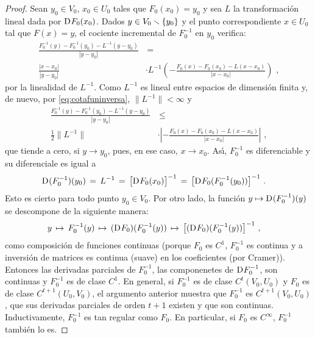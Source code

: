 \begin{proof}
	Sean $y_{0}\in V_{0}$, $x_{0}\in U_{0}$ tales que $F_{0}(x_{0})=y_{0}$
	y sea $L$ la transformaci\'{o}n lineal dada por
	$\mathrm{D}_{}{F_{0}}(x_{0})$. Dados $y\in V_{0}\smallsetminus\{y_{0}\}$ y
	el punto correspondiente $x\in U_{0}$ tal que $F(x)=y$, el
	cociente incremental de $F_{0}^{-1}$ en $y_{0}$ verifica:
	\begin{align*}
		\frac{F_{0}^{-1}(y)-F_{0}^{-1}(y_{0}) -L^{-1}(y-y_{0})}%
			{|y-y_{0}|} & \,=\, \\
		\frac{|x-x_{0}|}{|y-y_{0}|} & \cdot
			L^{-1}\left(
			-\frac{F_{0}(x)-F_{0}(x_{0})-L(x-x_{0})}{|x-x_{0}|}
			\right)
		\text{ ,}
	\end{align*}
	por la linealidad de $L^{-1}$. Como $L^{-1}$ es lineal entre espacios
	de dimensi\'{o}n finita y, de nuevo, por \eqref{eq:cotafuninversa},
	$\|L^{-1}\|<\infty$ y
	\begin{align*}
		\frac{F_{0}^{-1}(y)-F_{0}^{-1}(y_{0})-L^{-1}(y-y_{0})}%
			{|y-y_{0}|} & \,\leq\, \\
		\frac{1}{2}\|L^{-1}\| & \cdot
			\left|
			-\frac{F_{0}(x)-F_{0}(x_{0})-L(x-x_{0})}{|x-x_{0}|}
			\right|
		\text{ ,}
	\end{align*}
	que tiende a cero, si $y\to y_{0}$, pues, en ese caso, $x\to x_{0}$.
	As\'{\i}, $F_{0}^{-1}$ es diferenciable y su diferenciale es igual a
	\begin{align*}
		\mathrm{D}_{}{(F_{0}^{-1})}(y_{0}) & \,=\,L^{-1} \,=\,
			\big[\mathrm{D}_{}{F_{0}}(x_{0})\big]^{-1} \,=\,
			\big[\mathrm{D}_{}{F_{0}}(F_{0}^{-1}(y_{0}))\big]^{-1}
		\text{ .}
	\end{align*}
	Esto es cierto para todo punto $y_{0}\in V_{0}$. Por otro lado, la
	funci\'{o}n $y\mapsto\mathrm{D}_{}{(F_{0}^{-1})}(y)$ se descompone de
	la siguiente manera:
	\begin{align*}
		y & \,\mapsto\,F_{0}^{-1}(y)\,\mapsto\,
			(\mathrm{D}_{}{F_{0}})(F_{0}^{-1}(y)) \,\mapsto\,
			\big[(\mathrm{D}_{}{F_{0}})(F_{0}^{-1}(y))\big]^{-1}
		\text{ ,}
	\end{align*}
	como composici\'{o}n de funciones continuas (porque $F_{0}$ es
	$C^{1}$, $F_{0}^{-1}$ es continua y a inversi\'{o}n de matrices es
	continua (suave) en los coeficientes (por Cramer)). Entonces las
	derivadas parciales de $F_{0}^{-1}$, las componenetes de
	$\mathrm{D}_{}{F_{0}^{-1}}$, son continuas y $F_{0}^{-1}$ es de clase
	$C^{1}$. En general, si $F_{0}^{-1}$ es de clase $C^{t}(V_{0},U_{0})$
	y $F_{0}$ es de clase $C^{t+1}(U_{0},V_{0})$, el argumento anterior
	muestra que $F_{0}^{-1}$ es $C^{t+1}(V_{0},U_{0})$, que sus
	derivadas parciales de orden $t+1$ existen y que son continuas.
	Inductivamente, $F_{0}^{-1}$ es tan regular como $F_{0}$. En
	particular, si $F_{0}$ es $C^{\infty}$, $F_{0}^{-1}$ tambi\'{e}n
	lo es.
\end{proof}


